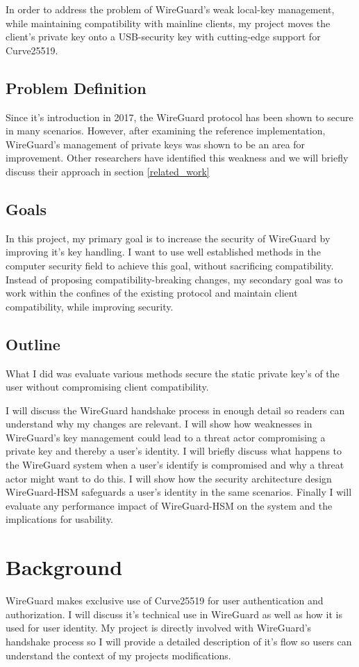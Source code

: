 \documentclass [11pt, proquest] {uwthesis}[2020/02/24]
\begin{document}
In order to address the problem of WireGuard's weak local-key management, while maintaining compatibility with mainline clients, my project moves the client's private key onto a USB-security key with cutting-edge support for Curve25519. 

\subsection{Problem Definition} \label{problem_definition}
Since it's introduction in 2017, the WireGuard protocol has been shown to secure in many scenarios. However, after examining the reference implementation, WireGuard's management of private keys was shown to be an area for improvement. Other researchers have identified this weakness and we will briefly discuss their approach in section \ref{related_work}

\subsection{Goals}
In this project, my primary goal is to increase the security of WireGuard by improving it's key handling. I want to use well established methods in the computer security field to achieve this goal, without sacrificing compatibility. Instead of proposing compatibility-breaking changes, my secondary goal was to work within the confines of the existing protocol and maintain client compatibility, while improving security.

\subsection{Outline}
What I did was evaluate various methods secure the static private key's of the user without compromising client compatibility.

I will discuss the WireGuard handshake process in enough detail so readers can understand why my changes are relevant.
I will show how weaknesses in WireGuard's key management could lead to a threat actor compromising a private key and thereby a user's identity. 
I will briefly discuss what happens to the WireGuard system when a user's identify is compromised and why a threat actor might want to do this.
I will show how the security architecture design WireGuard-HSM safeguards a user's identity in the same scenarios.
Finally I will evaluate any performance impact of WireGuard-HSM on the system and the implications for usability.


\section {Background}  \label{background}
WireGuard makes exclusive use of Curve25519 for user authentication and authorization. I will discuss it's technical use in WireGuard as well as how it is used for user identity. My project is directly involved with WireGuard's handshake process so I will provide a detailed description of it's flow so users can understand the context of my projects modifications.
\end{document}
